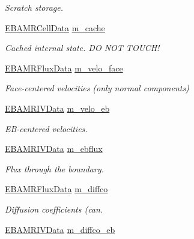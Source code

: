 \begin{DoxyCompactItemize}
\begin{DoxyCompactList}\small\item\em Scratch storage. \end{DoxyCompactList}\item 
\hyperlink{type__definitions_8H_a7e610f301989e5e07781c5e338bdb7c3}{E\+B\+A\+M\+R\+Cell\+Data} \hyperlink{classcdr__solver_ad9df1d6826a9dbb4d63965b2876d71d8}{m\+\_\+cache}
\begin{DoxyCompactList}\small\item\em Cached internal state. DO N\+OT T\+O\+U\+C\+H! \end{DoxyCompactList}\item 
\hyperlink{type__definitions_8H_aadad278b2e5d3d4abcf9032f90ba78c3}{E\+B\+A\+M\+R\+Flux\+Data} \hyperlink{classcdr__solver_a26f0373df0973d2c6f235c3c221585c4}{m\+\_\+velo\+\_\+face}
\begin{DoxyCompactList}\small\item\em Face-\/centered velocities (only normal components) \end{DoxyCompactList}\item 
\hyperlink{type__definitions_8H_a6b8fa905d55cbb491b52180386f0e0c1}{E\+B\+A\+M\+R\+I\+V\+Data} \hyperlink{classcdr__solver_a07d7ff94fb77874097df0a169d2f50d5}{m\+\_\+velo\+\_\+eb}
\begin{DoxyCompactList}\small\item\em E\+B-\/centered velocities. \end{DoxyCompactList}\item 
\hyperlink{type__definitions_8H_a6b8fa905d55cbb491b52180386f0e0c1}{E\+B\+A\+M\+R\+I\+V\+Data} \hyperlink{classcdr__solver_ac7b6d7c3af1fb23c6cd50314e3a34bbb}{m\+\_\+ebflux}
\begin{DoxyCompactList}\small\item\em Flux through the boundary. \end{DoxyCompactList}\item 
\hyperlink{type__definitions_8H_aadad278b2e5d3d4abcf9032f90ba78c3}{E\+B\+A\+M\+R\+Flux\+Data} \hyperlink{classcdr__solver_a368d0ede88c513dc1a96800f44ec4e42}{m\+\_\+diffco}
\begin{DoxyCompactList}\small\item\em Diffusion coefficients (can. \end{DoxyCompactList}\item 
\hyperlink{type__definitions_8H_a6b8fa905d55cbb491b52180386f0e0c1}{E\+B\+A\+M\+R\+I\+V\+Data} \hyperlink{classcdr__solver_a4fd316c26ea70c15bbac01ab2d8b41f3}{m\+\_\+diffco\+\_\+eb}

\end{DoxyCompactItemize}
